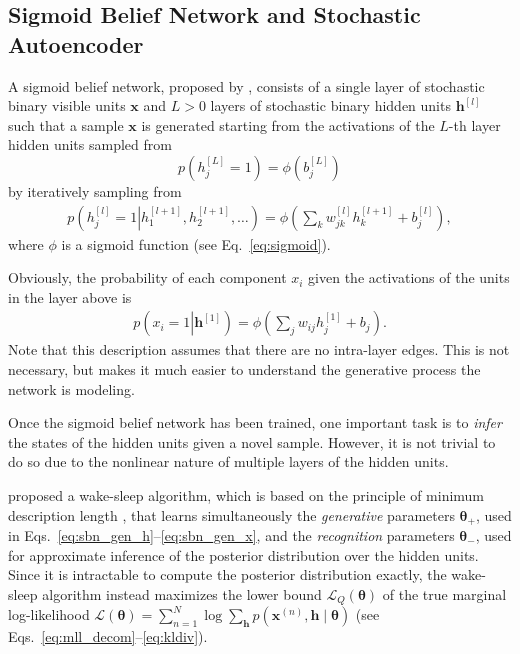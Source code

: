 \documentclass[dissertation,nocontribution,draft*]{aaltoseries}
\newcommand{\qlay}[1]{\left[#1\right]}
\newcommand{\vect}[1]{\mathbf{#1}}
\newcommand{\vects}[1]{\boldsymbol{#1}}
\newcommand{\vh}[0]{\vect{h}}
\newcommand{\vx}[0]{\vect{x}}
\newcommand{\TT}[0]{{\vects{\theta}}}
\newcommand{\LL}[0]{\mathcal{L}}
\begin{document}

\subsection{Sigmoid Belief Network and Stochastic Autoencoder}
\label{sec:sbn_dbn}

A sigmoid belief network, proposed by \citet{Neal1992},
consists of a single layer of stochastic binary visible
units $\vx$ and $L > 0$ layers of stochastic binary
hidden units $\vh^{\qlay{l}}$ such that a sample $\vx$ is
generated starting from the activations of the $L$-th layer
hidden units sampled from
\[
p\left(h_j^{\qlay{L}} = 1\right) = \phi\left( b_j^{\qlay{L}}
\right)
\]
by iteratively sampling from 
\begin{align}
    \label{eq:sbn_gen_h}
    p\left(h_j^{\qlay{l}} = 1 \left| h_1^{\qlay{l+1}},
    h_2^{\qlay{l+1}}, \dots
    \right.\right) = \phi\left( \sum_{k} w_{jk}^{\qlay{l}}
    h_k^{\qlay{l+1}} + b_j^{\qlay{l}}\right),
\end{align}
where $\phi$ is a sigmoid function (see
Eq.~\eqref{eq:sigmoid}). 

Obviously, the probability of each component $x_i$ given the
activations of the units in the layer above is
\begin{align}
    \label{eq:sbn_gen_x}
    p\left(x_i = 1 \left| \vh^{\qlay{1}}
    \right.\right) = \phi\left( \sum_{j} w_{ij}
    h_j^{\qlay{1}} + b_j\right).
\end{align}
Note that this description assumes that there are no
intra-layer edges. This is not necessary, but makes it much
easier to understand the generative process the network is
modeling.

Once the sigmoid belief network has been trained, one 
important task is to \textit{infer} the states of the hidden
units given a novel sample. However, it is not trivial to do
so due to the nonlinear nature of multiple layers of the
hidden units.

\citet{Hinton1995} proposed a wake-sleep algorithm, which is
based on the principle of minimum description length
\citep[see, e.g.,][and references therein]{Grunwald2007},
that learns simultaneously the \textit{generative}
parameters $\TT_+$, used in
Eqs.~\eqref{eq:sbn_gen_h}--\eqref{eq:sbn_gen_x}, and the
\textit{recognition} parameters $\TT_-$, used for
approximate inference of the posterior distribution over the
hidden units. Since it is intractable to compute the
posterior distribution exactly, the wake-sleep algorithm
instead maximizes the lower bound $\LL_Q(\TT)$ of the true
marginal log-likelihood $\LL(\TT) = \sum_{n=1}^N \log
\sum_{\vh} p(\vx^{(n)}, \vh \mid \TT)$ (see
Eqs.~\eqref{eq:mll_decom}--\eqref{eq:kldiv}).
\end{document}
